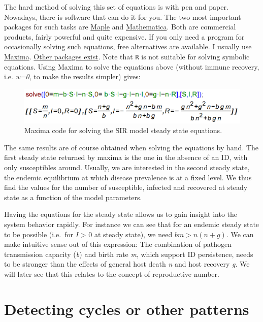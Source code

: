 \documentclass[]{book}
\theoremstyle{definition}
\theoremstyle{definition}
\theoremstyle{definition}
\theoremstyle{remark}
\begin{document}
The hard method of solving this set of equations is with pen and paper.
Nowadays, there is software that can do it for you. The two most
important packages for such tasks are
\href{http://www.maplesoft.com/}{Maple} and
\href{https://www.wolfram.com/mathematica/}{Mathematica}. Both are
commercial products, fairly powerful and quite expensive. If you only
need a program for occasionally solving such equations, free
alternatives are available. I usually use
\href{http://maxima.sourceforge.net/}{Maxima}.
\href{http://en.wikipedia.org/wiki/Comparison_of_computer_algebra_systems}{Other
packages exist}. Note that \texttt{R} is not suitable for solving
symbolic equations. Using Maxima to solve the equations above (without
immune recovery, i.e. \emph{w=0}, to make the results simpler) gives:

\begin{figure}
\centering
\includegraphics{./images/SSmaxima.png}
\caption{\label{fig:SSmaxima}Maxima code for solving the SIR model steady
state equations.}
\end{figure}

The same results are of course obtained when solving the equations by
hand. The first steady state returned by maxima is the one in the
absence of an ID, with only susceptibles around. Usually, we are
interested in the second steady state, the endemic equilibrium at which
disease prevalence is at a fixed level. We thus find the values for the
number of susceptible, infected and recovered at steady state as a
function of the model parameters.

Having the equations for the steady state allows us to gain insight into
the system behavior rapidly. For instance we can see that for an endemic
steady state to be possible (i.e.~for \emph{I} \textgreater{} 0 at
steady state), we need \(b m > n (n+ g)\). We can make intuitive sense
out of this expression: The combination of pathogen transmission
capacity (\emph{b}) and birth rate \emph{m}, which support ID
persistence, needs to be stronger than the effects of general host death
\emph{n} and host recovery \emph{g}. We will later see that this relates
to the concept of reproductive number.

\section{Detecting cycles or other
patterns}\label{detecting-cycles-or-other-patterns}
\end{document}
